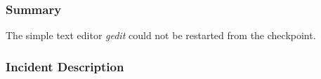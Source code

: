 







\subsubsection{Summary}
The simple text editor \emph{gedit} could not be restarted from the checkpoint. 

\subsubsection{Incident Description}

